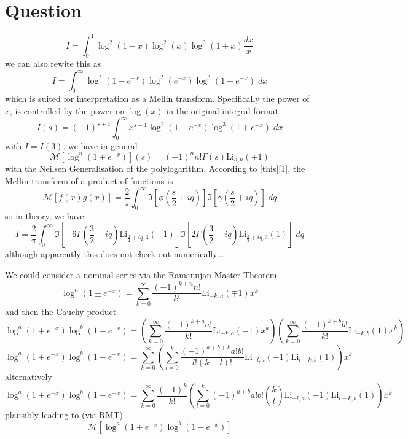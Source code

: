 \documentclass{article}
\begin{document}
\section{Question}
$$
I = \int_0^1 \log^2(1-x) \log^2(x) \log^3(1+x) \frac{dx}{x}
$$
we can also rewite this as 
$$
I = \int_0^\infty \log^2(1-e^{-x}) \log^2(e^{-x}) \log^3(1+e^{-x}) \; dx
$$
which is suited for interpretation as a Mellin transform. Specifically the power of $x$, is controlled by the power on $\log(x)$ in the original integral format.
$$
I(s) = (-1)^{s+1} \int_0^\infty x^{s-1} \log^2(1-e^{-x}) \log^3(1+e^{-x}) \; dx
$$
with $I=I(3)$.
we have in general
$$
\mathcal{M}[\log^n(1\pm e^{-x})](s) = (-1)^n n! \Gamma(s) \mathrm{Li}_{s,n}(\mp 1)
$$
with the Neilsen Generalisation of the polylogarithm. According to [this][1], the Mellin transform of a product of functions is
$$
\mathcal{M}[f(x) g(x)] = \frac{2}{\pi}\int_0^\infty \Im[\phi(\frac{s}{2}+i q)]\Im[\gamma(\frac{s}{2} + iq)] \; dq
$$
so in theory, we have
$$
I = \frac{2}{\pi}\int_0^\infty \Im\left[-6 \Gamma(\frac{3}{2}+i q) \mathrm{Li}_{\frac{3}{2}+i q,3}(-1)\right]\Im\left[2\Gamma(\frac{3}{2}+i q) \mathrm{Li}_{\frac{3}{2}+i q,2}(1)\right] \; dq
$$
although apparently this does not check out numerically... 

We could consider a nominal series via the Ramanujan Master Theorem
$$
\log^n(1\pm e^{-x}) = \sum_{k=0}^\infty \frac{(-1)^{k+n} n!}{k!} \mathrm{Li}_{-k,n}(\mp 1)x^k
$$
and then the Cauchy product
$$
\log^a(1 + e^{-x})\log^b(1 - e^{-x}) = \left( \sum_{k=0}^\infty \frac{(-1)^{k+a} a!}{k!} \mathrm{Li}_{-k,a}(-1)x^k \right)\left( \sum_{k=0}^\infty \frac{(-1)^{k+b} b!}{k!} \mathrm{Li}_{-k,b}(1)x^k \right)
$$
$$
\log^a(1 + e^{-x})\log^b(1 - e^{-x}) = \sum_{k=0}^\infty \left(\sum_{l=0}^k \frac{(-1)^{a+b+k} a! b!}{l!(k-l)!} \mathrm{Li}_{-l,a}(-1) \mathrm{Li}_{l-k,b}(1)\right) x^k
$$
alternatively 
$$
\log^a(1 + e^{-x})\log^b(1 - e^{-x}) = \sum_{k=0}^\infty \frac{(-1)^k}{k!} \left(\sum_{l=0}^k (-1)^{a+b} a! b! \binom{k}{l} \mathrm{Li}_{-l,a}(-1) \mathrm{Li}_{l-k,b}(1)\right) x^k
$$
plausibly leading to (via RMT)
$$
\mathcal{M}\left[ \log^a(1 + e^{-x})\log^b(1 - e^{-x})\right]
$$




{}

\end{document}
